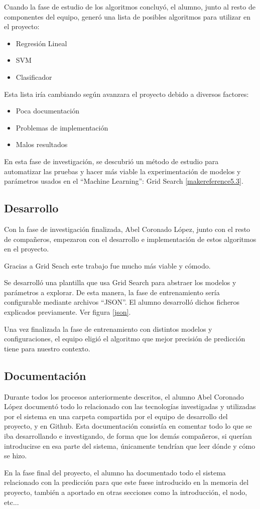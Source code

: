 Cuando la fase de estudio de los algoritmos concluyó, el alumno, junto al resto de componentes del equipo, generó una lista de posibles algoritmos para utilizar en el proyecto: 

\begin{itemize}
\item Regresión Lineal
\item SVM
\item Clasificador
\end{itemize}

Esta lista iría cambiando según avanzara el proyecto debido a diversos factores:

\begin{itemize}
\item Poca documentación
\item Problemas de implementación
\item Malos resultados
\end{itemize}

En esta fase de investigación, se descubrió un método de estudio para automatizar las pruebas y hacer más viable la experimentación de modelos y parámetros usados en el ``Machine Learning'': Grid Search \ref{makereference5.3}.

\subsection{Desarrollo}
Con la fase de investigación finalizada, Abel Coronado López, junto con el resto de compañeros, empezaron con el desarrollo e implementación de estos algoritmos en el proyecto.

Gracias a Grid Seach este trabajo fue mucho más viable y cómodo.

Se desarrolló una plantilla que usa Grid Search para abstraer los modelos y parámetros a explorar. De esta manera, la fase de entrenamiento sería configurable mediante archivos ``JSON''. El alumno desarrolló dichos ficheros explicados previamente. Ver figura \ref{json}.

Una vez finalizada la fase de entrenamiento con distintos modelos y configuraciones, el equipo eligió el algoritmo que mejor precisión de predicción tiene para nuestro contexto.

\subsection{Documentación}
Durante todos los procesos anteriormente descritos, el alumno Abel Coronado López documentó todo lo relacionado con las tecnologías investigadas y utilizadas por el sistema en una carpeta compartida por el equipo de desarrollo del proyecto, y en Github. Esta documentación consistía en comentar todo lo que se iba desarrollando e investigando, de forma que los demás compañeros, si querían introducirse en esa parte del sistema, únicamente tendrían que leer dónde y cómo se hizo.

En la fase final del proyecto, el alumno ha documentado todo el sistema relacionado con la predicción para que este fuese introducido en la memoria del proyecto, también a aportado en otras secciones como la introducción, el nodo, etc...